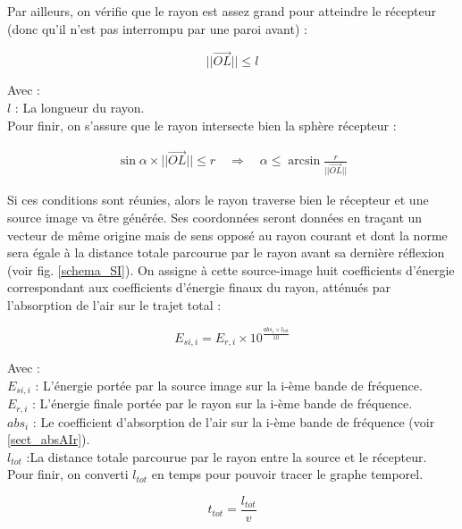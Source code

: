 Par ailleurs, on vérifie que le rayon est assez grand pour atteindre le récepteur (donc qu'il n'est pas interrompu par une paroi avant) :

\begin{equation}
||\overrightarrow{OL}|| \leqslant l
\end{equation}

Avec : \\
$l$ : La longueur du rayon. \\

Pour finir, on s'assure que le rayon intersecte bien la sphère récepteur :

\begin{align}
\sin{\alpha} \times ||\overrightarrow{OL}||  \leqslant r 
\quad \Rightarrow \quad
\alpha  \leqslant \arcsin{\frac{r}{||\overrightarrow{OL}||}}
\end{align}

Si ces conditions sont réunies, alors le rayon traverse bien le récepteur et une source image va être générée. Ses coordonnées seront données en traçant un vecteur de même origine mais de sens opposé au rayon courant et dont la norme sera égale à la distance totale parcourue par le rayon avant sa dernière réflexion (voir fig. \ref{schema_SI}). On assigne à cette source-image huit coefficients d'énergie correspondant aux coefficients d'énergie finaux du rayon, atténués par l'absorption de l'air sur le trajet total :

\begin{equation}
E_{si, i} = E_{r, i} \times 10^{\frac{abs_i \times l_{tot} }{10}}
\end{equation}

Avec : \\
$E_{si, i}$ : L'énergie portée par la source image sur la i-ème bande de fréquence. \\
$E_{r, i}$ : L'énergie finale portée par le rayon sur la i-ème bande de fréquence. \\
$abs_i$ : Le coefficient d'absorption de l'air sur la i-ème bande de fréquence (voir \ref{sect_absAIr}). \\
$ l_{tot}$ :La distance totale parcourue par le rayon entre la source et le récepteur. \\

Pour finir, on converti  $l_{tot}$ en temps pour pouvoir tracer le graphe temporel.

\begin{equation}
 t_{tot} =  \frac{l_{tot}}{v}
\end{equation}

